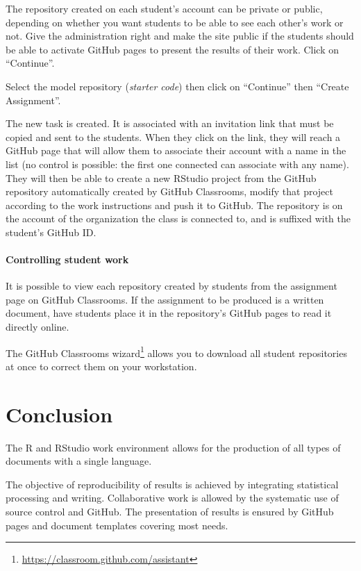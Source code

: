 \documentclass[
  12pt,
  american,
  a4paper,
  extrafontsizes,onecolumn,openright
  ]{memoir}
\begin{document}
The repository created on each student's account can be private or public, depending on whether you want students to be able to see each other's work or not.
Give the administration right and make the site public if the students should be able to activate GitHub pages to present the results of their work.
Click on \enquote{Continue}.

Select the model repository (\emph{starter code}) then click on \enquote{Continue} then \enquote{Create Assignment}.

The new task is created.
It is associated with an invitation link that must be copied and sent to the students.
When they click on the link, they will reach a GitHub page that will allow them to associate their account with a name in the list (no control is possible: the first one connected can associate with any name).
They will then be able to create a new RStudio project from the GitHub repository automatically created by GitHub Classrooms, modify that project according to the work instructions and push it to GitHub.
The repository is on the account of the organization the class is connected to, and is suffixed with the student's GitHub ID.

\subsubsection{Controlling student work}\label{controlling-student-work}

It is possible to view each repository created by students from the assignment page on GitHub Classrooms.
If the assignment to be produced is a written document, have students place it in the repository's GitHub pages to read it directly online.

The GitHub Classrooms wizard\footnote{\url{https://classroom.github.com/assistant}} allows you to download all student repositories at once to correct them on your workstation.

\chapter{Conclusion}\label{chap-conclusion}

The R and RStudio work environment allows for the production of all types of documents with a single language.

The objective of reproducibility of results is achieved by integrating statistical processing and writing.
Collaborative work is allowed by the systematic use of source control and GitHub.
The presentation of results is ensured by GitHub pages and document templates covering most needs.
\end{document}
